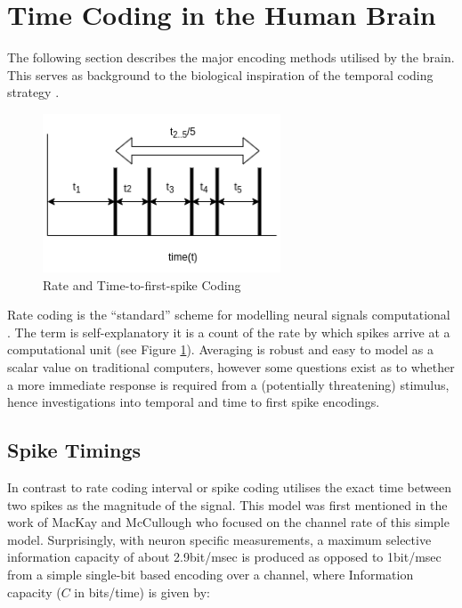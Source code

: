\documentclass{article}
\begin{document}
\section{Time Coding in the Human Brain} \label{app:brain}

The following section describes the major encoding methods utilised by the brain. This serves as background to the biological inspiration of the temporal coding strategy \cite{victor2000brain}.

\begin{figure}[ht]
	\centering
	\includegraphics[width=200pt]{figures/rate.png}
	\caption{Rate and Time-to-first-spike Coding}
	\label{fig:rate}
\end{figure}

Rate coding is the ``standard'' scheme for modelling neural signals computational \cite{rosenblatt1958perceptron}. The term is self-explanatory it is a count of the rate by which spikes arrive at a computational unit (see Figure \ref{fig:rate}). Averaging is robust and easy to model as a scalar value on traditional computers, however some questions exist as to whether a more immediate response is required from a (potentially threatening) stimulus, hence investigations into temporal and time to first spike encodings.

\subsection{Spike Timings}

In contrast to rate coding interval or spike coding utilises the exact time between two spikes as the magnitude of the signal. This model was first mentioned in the work of MacKay and McCullough \cite{MacKay1952} who focused on the channel rate of this simple model. Surprisingly, with neuron specific measurements, a maximum selective information capacity of about 2.9bit/msec is produced as opposed to 1bit/msec from a simple single-bit based encoding over a channel, where Information capacity ($C$ in bits/time) is given by:
\end{document}
